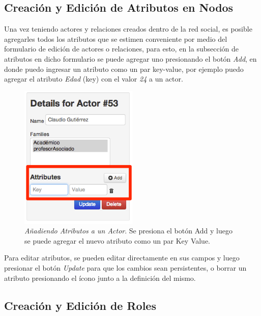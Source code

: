 
\subsection{Creación y Edición de Atributos en Nodos} %
\label{sub:creacion_y_edicion_de_atributos_en_nodos}

Una vez teniendo actores y relaciones creados dentro de la red social, es posible agregarles todos los atributos que se estimen conveniente por medio del formulario de edición de actores o relaciones, para esto, en la subsección de atributos en dicho formulario se puede agregar uno presionando el botón \emph{Add}, en donde puedo ingresar un atributo como un par key-value, por ejemplo puedo agregar el atributo \emph{Edad} (key) con el valor \emph{24} a un actor.

\begin{figure}[H]
  \centering
  \includegraphics[width=0.5\textwidth]{images/insercion_atributos.png}
  \caption[Añadiendo Atributos a un Actor]{\emph{Añadiendo Atributos a un Actor}. Se presiona el botón Add y luego se puede agregar el nuevo atributo como un par Key Value.}
  \label{insercion_atributos}
\end{figure}

Para editar atributos, se pueden editar directamente en sus campos y luego presionar el botón \emph{Update} para que los cambios sean persistentes, o borrar un atributo presionando el ícono junto a la definición del mismo.


\subsection{Creación y Edición de Roles} %
\label{sub:creacion_y_edicion_de_roles}

